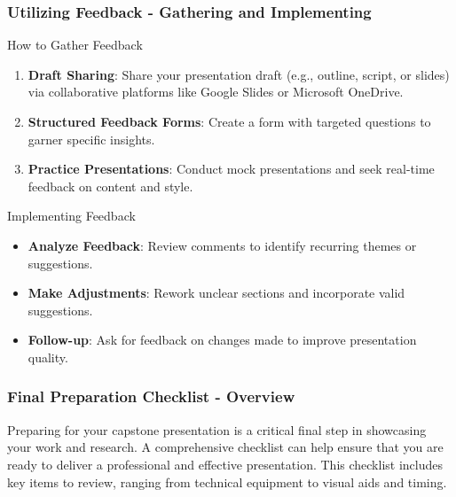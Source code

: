 \documentclass[aspectratio=169]{beamer}
\begin{document}
\begin{frame}[fragile]
    \frametitle{Utilizing Feedback - Gathering and Implementing}
    \begin{block}{How to Gather Feedback}
        \begin{enumerate}
            \item \textbf{Draft Sharing}: Share your presentation draft (e.g., outline, script, or slides) via collaborative platforms like Google Slides or Microsoft OneDrive.
            \item \textbf{Structured Feedback Forms}: Create a form with targeted questions to garner specific insights. 
            \item \textbf{Practice Presentations}: Conduct mock presentations and seek real-time feedback on content and style.
        \end{enumerate}
    \end{block}

    \begin{block}{Implementing Feedback}
        \begin{itemize}
            \item \textbf{Analyze Feedback}: Review comments to identify recurring themes or suggestions.
            \item \textbf{Make Adjustments}: Rework unclear sections and incorporate valid suggestions.
            \item \textbf{Follow-up}: Ask for feedback on changes made to improve presentation quality.
        \end{itemize}
    \end{block}
\end{frame}

\begin{frame}[fragile]
    \frametitle{Final Preparation Checklist - Overview}
    Preparing for your capstone presentation is a critical final step in showcasing your work and research. 
    A comprehensive checklist can help ensure that you are ready to deliver a professional and effective presentation. 
    This checklist includes key items to review, ranging from technical equipment to visual aids and timing.
\end{frame}
\end{document}
